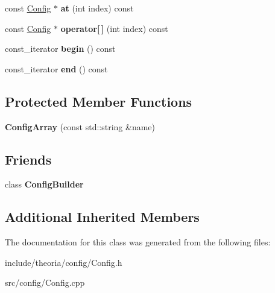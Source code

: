\begin{DoxyCompactItemize}
\item 
\hypertarget{classtheoria_1_1config_1_1ConfigArray_a32a1300df2bbc604f48b5843b61f6ca9}{const \hyperlink{classtheoria_1_1config_1_1Config}{Config} $\ast$ {\bfseries at} (int index) const }\label{classtheoria_1_1config_1_1ConfigArray_a32a1300df2bbc604f48b5843b61f6ca9}

\item 
\hypertarget{classtheoria_1_1config_1_1ConfigArray_ab12cb7e2c7afd844314ba0b99e32bc8c}{const \hyperlink{classtheoria_1_1config_1_1Config}{Config} $\ast$ {\bfseries operator\mbox{[}$\,$\mbox{]}} (int index) const }\label{classtheoria_1_1config_1_1ConfigArray_ab12cb7e2c7afd844314ba0b99e32bc8c}

\item 
\hypertarget{classtheoria_1_1config_1_1ConfigArray_afcf3cea7336e6ffcc398d11ddc100c88}{const\+\_\+iterator {\bfseries begin} () const }\label{classtheoria_1_1config_1_1ConfigArray_afcf3cea7336e6ffcc398d11ddc100c88}

\item 
\hypertarget{classtheoria_1_1config_1_1ConfigArray_a7191bc6e4f1191067cfc56601872703a}{const\+\_\+iterator {\bfseries end} () const }\label{classtheoria_1_1config_1_1ConfigArray_a7191bc6e4f1191067cfc56601872703a}

\end{DoxyCompactItemize}
\subsection*{Protected Member Functions}
\begin{DoxyCompactItemize}
\item 
\hypertarget{classtheoria_1_1config_1_1ConfigArray_a9086dda6fa6d659256f50be797dfe719}{{\bfseries Config\+Array} (const std\+::string \&name)}\label{classtheoria_1_1config_1_1ConfigArray_a9086dda6fa6d659256f50be797dfe719}

\end{DoxyCompactItemize}
\subsection*{Friends}
\begin{DoxyCompactItemize}
\item 
\hypertarget{classtheoria_1_1config_1_1ConfigArray_a3d61732fded713b38fc7f9fe3d80e2ae}{class {\bfseries Config\+Builder}}\label{classtheoria_1_1config_1_1ConfigArray_a3d61732fded713b38fc7f9fe3d80e2ae}

\end{DoxyCompactItemize}
\subsection*{Additional Inherited Members}


The documentation for this class was generated from the following files\+:\begin{DoxyCompactItemize}
\item 
include/theoria/config/Config.\+h\item 
src/config/Config.\+cpp\end{DoxyCompactItemize}
